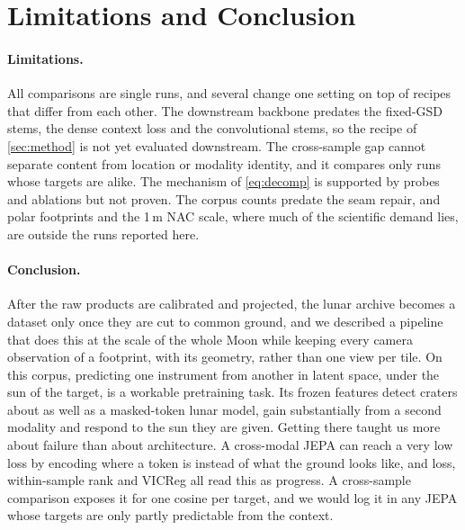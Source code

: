 \section{Limitations and Conclusion}
\label{sec:conclusion}

\paragraph{Limitations.} All comparisons are single runs, and several change one setting on top of recipes that differ from each other. The downstream backbone predates the fixed-GSD stems, the dense context loss and the convolutional stems, so the recipe of \cref{sec:method} is not yet evaluated downstream. The cross-sample gap cannot separate content from location or modality identity, and it compares only runs whose targets are alike. The mechanism of \cref{eq:decomp} is supported by probes and ablations but not proven. The corpus counts predate the seam repair, and polar footprints and the 1\,m NAC scale, where much of the scientific demand lies, are outside the runs reported here.

\paragraph{Conclusion.} After the raw products are calibrated and projected, the lunar archive becomes a dataset only once they are cut to common ground, and we described a pipeline that does this at the scale of the whole Moon while keeping every camera observation of a footprint, with its geometry, rather than one view per tile. On this corpus, predicting one instrument from another in latent space, under the sun of the target, is a workable pretraining task. Its frozen features detect craters about as well as a masked-token lunar model, gain substantially from a second modality and respond to the sun they are given. Getting there taught us more about failure than about architecture. A cross-modal JEPA can reach a very low loss by encoding where a token is instead of what the ground looks like, and loss, within-sample rank and VICReg all read this as progress. A cross-sample comparison exposes it for one cosine per target, and we would log it in any JEPA whose targets are only partly predictable from the context.

